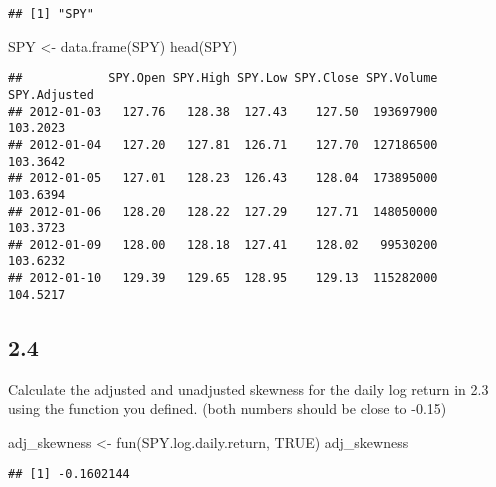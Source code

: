 \documentclass[
]{article}
\newenvironment{Shaded}{\begin{snugshade}}{\end{snugshade}}
\newcommand{\ConstantTok}[1]{\textcolor[rgb]{0.00,0.00,0.00}{#1}}
\newcommand{\FunctionTok}[1]{\textcolor[rgb]{0.00,0.00,0.00}{#1}}
\newcommand{\NormalTok}[1]{#1}
\newcommand{\OtherTok}[1]{\textcolor[rgb]{0.56,0.35,0.01}{#1}}
\newcommand{\SpecialCharTok}[1]{\textcolor[rgb]{0.00,0.00,0.00}{#1}}
\begin{document}
\begin{verbatim}
## [1] "SPY"
\end{verbatim}

\begin{Shaded}
\begin{Highlighting}[]
\NormalTok{SPY }\OtherTok{\textless{}{-}} \FunctionTok{data.frame}\NormalTok{(SPY)}
\FunctionTok{head}\NormalTok{(SPY)}
\end{Highlighting}
\end{Shaded}

\begin{verbatim}
##            SPY.Open SPY.High SPY.Low SPY.Close SPY.Volume SPY.Adjusted
## 2012-01-03   127.76   128.38  127.43    127.50  193697900     103.2023
## 2012-01-04   127.20   127.81  126.71    127.70  127186500     103.3642
## 2012-01-05   127.01   128.23  126.43    128.04  173895000     103.6394
## 2012-01-06   128.20   128.22  127.29    127.71  148050000     103.3723
## 2012-01-09   128.00   128.18  127.41    128.02   99530200     103.6232
## 2012-01-10   129.39   129.65  128.95    129.13  115282000     104.5217
\end{verbatim}

\begin{Shaded}
\end{Shaded}

\hypertarget{section-10}{%
\subsection{2.4}\label{section-10}}

Calculate the adjusted and unadjusted skewness for the daily log return
in 2.3 using the function you defined. (both numbers should be close to
-0.15)

\begin{Shaded}
\begin{Highlighting}[]
\NormalTok{adj\_skewness }\OtherTok{\textless{}{-}} \FunctionTok{fun}\NormalTok{(SPY.log.daily.return, }\ConstantTok{TRUE}\NormalTok{)}
\NormalTok{adj\_skewness}
\end{Highlighting}
\end{Shaded}

\begin{verbatim}
## [1] -0.1602144
\end{verbatim}
\end{document}
